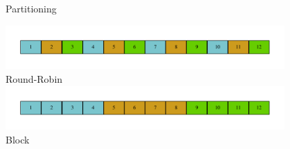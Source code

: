 \documentclass[10pt]{beamer}
\begin{document}
\begin{frame}{Partitioning}
    \begin{center}
    \includegraphics[width=0.8\textwidth]{../figs/graphviz/round_robin_partitioning.pdf} \\
    Round-Robin \\
    \includegraphics[width=0.8\textwidth]{../figs/graphviz/block_partitioning.pdf} \\
    Block \\
  \end{center}
\end{frame}
\end{document}
